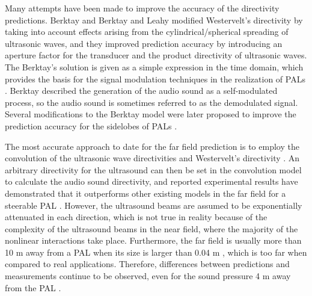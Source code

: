 Many attempts have been made to improve the accuracy of the directivity predictions.
Berktay \cite{Berktay1965PossibleExploitationNonlinear} and Berktay and Leahy \cite{Berktay1974FarfieldPerformanceParametric} modified Westervelt's directivity by taking into account effects arising from the cylindrical/spherical spreading of ultrasonic waves, and they improved prediction accuracy by introducing an aperture factor for the transducer and the product directivity of ultrasonic waves. 
The Berktay's solution is given as a simple expression in the time domain, which provides the basis for the signal modulation techniques in the realization of PALs \cite{Gan2012ReviewParametricAcoustic, Shi2016VolterraModelParametric}.
Berktay described the generation of the audio sound as a self-modulated process, so the audio sound is sometimes referred to as the demodulated signal.
Several modifications to the Berktay model were later proposed to improve the prediction accuracy for the sidelobes of PALs \cite{Shi2012ProductDirectivityModels}.

The most accurate approach to date for the far field prediction is to employ the convolution of the ultrasonic wave directivities and Westervelt's directivity \cite{Shi2015ConvolutionModelComputing, Guasch2018FarfieldDirectivityParametric, Shi2022ExtendedConvolutionModel}.
An arbitrary directivity for the ultrasound can then be set in the convolution model to calculate the audio sound directivity, and reported experimental results have demonstrated that it outperforms other existing models in the far field for a steerable PAL \cite{Shi2014OverviewDirectivityControl, Shi2015ConvolutionModelComputing}. 
However, the ultrasound beams are assumed to be exponentially attenuated in each direction, which is not true in reality because of the complexity of the ultrasound beams in the near field, where the majority of the nonlinear interactions take place. 
Furthermore, the far field is usually more than 10 m away from a PAL when its size is larger than 0.04 m \cite{Moffett1981NearfieldCharacteristicsParametric, Zhong2021FieldWesterveltFar}, which is too far when compared to real applications. 
Therefore, differences between predictions and measurements continue to be observed, even for the sound pressure 4 m away from the PAL \cite{Shi2015ConvolutionModelComputing}.





